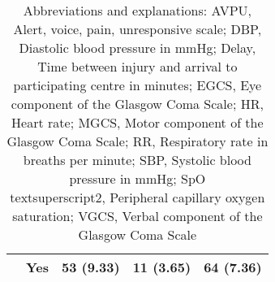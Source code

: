 \documentclass[10pt,letterpaper]{article}\usepackage[]{graphicx}\usepackage[]{color}
\begin{document}
\begin{table}[ht]
\begin{tabular}{lllll}
   & Yes & 53 (9.33) & 11 (3.65) & 64 (7.36) \\ 
   \hline
\end{tabular}
\caption*{Abbreviations and explanations: AVPU, Alert, voice, pain, unresponsive scale; DBP, Diastolic blood pressure in mmHg; Delay, Time between injury and arrival to participating centre in minutes; EGCS, Eye component of the Glasgow Coma Scale; HR, Heart rate; MGCS, Motor component of the Glasgow Coma Scale; RR, Respiratory rate in breaths per minute; SBP, Systolic blood pressure in mmHg; SpO\\textsuperscript{2}, Peripheral capillary oxygen saturation; VGCS, Verbal component of the Glasgow Coma Scale} 
\end{table}


\end{document}
